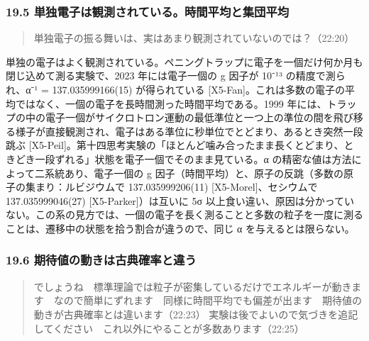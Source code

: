 \documentclass[
  a4paper,
]{ltjsarticle}
\begin{document}
\subsubsection{19.5
単独電子は観測されている。時間平均と集団平均}\label{ux5358ux72ecux96fbux5b50ux306fux89b3ux6e2cux3055ux308cux3066ux3044ux308bux6642ux9593ux5e73ux5747ux3068ux96c6ux56e3ux5e73ux5747}

\begin{quote}
単独電子の振る舞いは、実はあまり観測されていないのでは？（22:20）
\end{quote}

単独の電子はよく観測されている。ペニングトラップに電子を一個だけ何か月も閉じ込めて測る実験で、2023
年には電子一個の g 因子が 10⁻¹³ の精度で測られ、α⁻¹ = 137.035999166(15)
が得られている
{[}X5-Fan{]}。これは多数の電子の平均ではなく、一個の電子を長時間測った時間平均である。1999
年には、トラップの中の電子一個がサイクロトロン運動の最低準位と一つ上の準位の間を飛び移る様子が直接観測され、電子はある準位に秒単位でとどまり、あるとき突然一段跳ぶ
{[}X5-Peil{]}。第十四思考実験の「ほとんど噛み合ったまま長くとどまり、ときどき一段ずれる」状態を電子一個でそのまま見ている。α
の精密な値は方法によって二系統あり、電子一個の g
因子（時間平均）と、原子の反跳（多数の原子の集まり：ルビジウムで
137.035999206(11) {[}X5-Morel{]}、セシウムで 137.035999046(27)
{[}X5-Parker{]}）は互いに 5σ
以上食い違い、原因は分かっていない。この系の見方では、一個の電子を長く測ることと多数の粒子を一度に測ることは、遷移中の状態を拾う割合が違うので、同じ
α を与えるとは限らない。

\subsubsection{19.6
期待値の動きは古典確率と違う}\label{ux671fux5f85ux5024ux306eux52d5ux304dux306fux53e4ux5178ux78baux7387ux3068ux9055ux3046}

\begin{quote}
でしょうね　標準理論では粒子が密集しているだけでエネルギーが動きます　なので簡単にずれます　同様に時間平均でも偏差が出ます　期待値の動きが古典確率とは違います（22:23）
実験は後でよいので気づきを追記してください　これ以外にやることが多数あります（22:25）
\end{quote}
\end{document}
